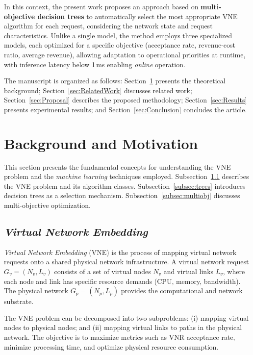 \documentclass[conference]{IEEEtran}
\begin{document}
In this context, the present work proposes an approach based on \textbf{multi-objective decision trees} to automatically select the most appropriate VNE algorithm for each request, considering the network state and request characteristics.
Unlike a single model, the method employs three specialized models, each optimized for a specific objective (acceptance rate, revenue-cost ratio, average revenue), allowing adaptation to operational priorities at runtime, with inference latency below 1\,ms enabling \textit{online} operation.

The manuscript is organized as follows: Section~\ref{sec:RefTeo} presents the theoretical background; Section~\ref{sec:RelatedWork} discusses related work; Section~\ref{sec:Proposal} describes the proposed methodology; Section~\ref{sec:Results} presents experimental results; and Section~\ref{sec:Conclusion} concludes the article.

\section{Background and Motivation}
\label{sec:RefTeo}

This section presents the fundamental concepts for understanding the VNE problem and the \textit{machine learning} techniques employed.
Subsection~\ref{subsec:vne} describes the VNE problem and its algorithm classes.
Subsection~\ref{subsec:trees} introduces decision trees as a selection mechanism.
Subsection~\ref{subsec:multiobj} discusses multi-objective optimization.

\subsection{\textit{Virtual Network Embedding}}
\label{subsec:vne}

\textit{Virtual Network Embedding} (VNE) is the process of mapping virtual network requests onto a shared physical network infrastructure.
A virtual network request $G_v = (N_v, L_v)$ consists of a set of virtual nodes $N_v$ and virtual links $L_v$, where each node and link has specific resource demands (CPU, memory, bandwidth).
The physical network $G_p = (N_p, L_p)$ provides the computational and network substrate.

The VNE problem can be decomposed into two subproblems: (i) mapping virtual nodes to physical nodes; and (ii) mapping virtual links to paths in the physical network. The objective is to maximize metrics such as VNR acceptance rate, minimize processing time, and optimize physical resource consumption.
\end{document}
